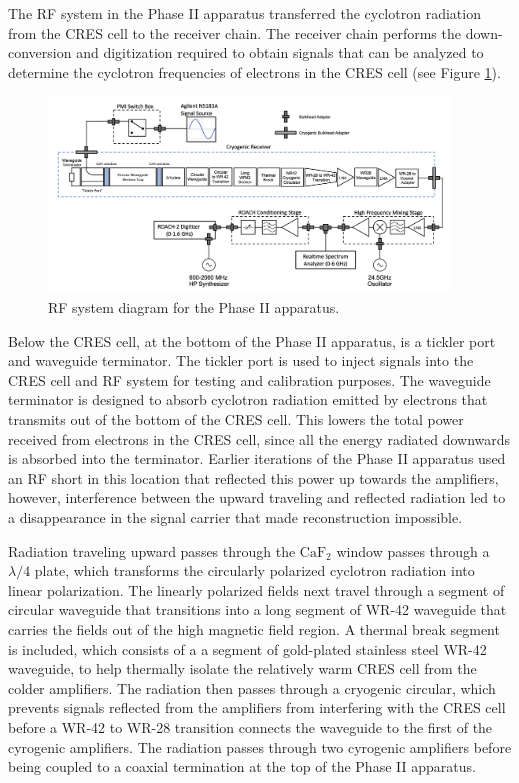 The RF system in the Phase II apparatus transferred the cyclotron radiation from the CRES cell to the receiver chain. The receiver chain performs the down-conversion and digitization required to obtain signals that can be analyzed to determine the cyclotron frequencies of electrons in the CRES cell (see Figure \ref{fig:chap3-phase2-rf-chain}).
\begin{figure}[htbp]
    \centering
    \includegraphics*[width=0.95\textwidth]{figs/Chapter-3/230620_phase2_rf_chain.png}
    \caption{\label{fig:chap3-phase2-rf-chain} RF system diagram for the Phase II apparatus.}
\end{figure}

Below the CRES cell, at the bottom of the Phase II apparatus, is a tickler port and waveguide terminator. The tickler port is used to inject signals into the CRES cell and RF system for testing and calibration purposes. The waveguide terminator is designed to absorb cyclotron radiation emitted by electrons that transmits out of the bottom of the CRES cell. This lowers the total power received from electrons in the CRES cell, since all the energy radiated downwards is absorbed into the terminator. Earlier iterations of the Phase II apparatus used an RF short in this location that reflected this power up towards the amplifiers, however, interference between the upward traveling and reflected radiation led to a disappearance in the signal carrier that made reconstruction impossible.

Radiation traveling upward passes through the $\mathrm{CaF}_2$ window passes through a $\lambda/4$ plate, which transforms the circularly polarized cyclotron radiation into linear polarization. The linearly polarized fields next travel through a segment of circular waveguide that transitions into a long segment of WR-42 waveguide that carries the fields out of the high magnetic field region. A thermal break segment is included, which consists of a a segment of gold-plated stainless steel WR-42 waveguide, to help thermally isolate the relatively warm CRES cell from the colder amplifiers. The radiation then passes through a cryogenic circular, which prevents signals reflected from the amplifiers from interfering with the CRES cell before a WR-42 to WR-28 transition connects the waveguide to the first of the cyrogenic amplifiers. The radiation passes through two cyrogenic amplifiers before being coupled to a coaxial termination at the top of the Phase II apparatus.

